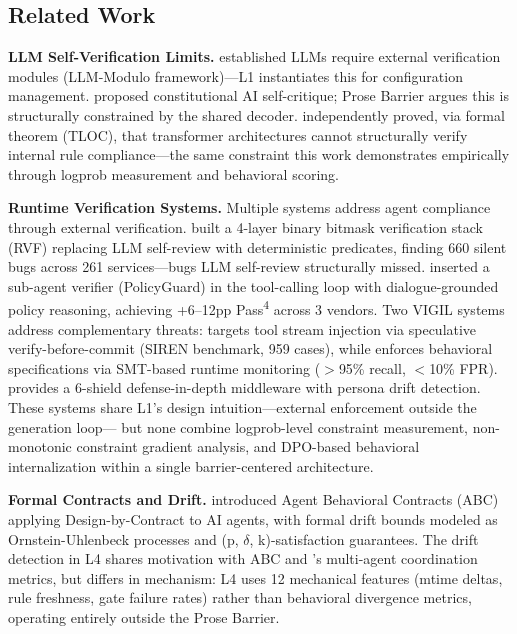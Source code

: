 \documentclass[11pt]{article}
\begin{document}
\subsection{Related Work}

\textbf{LLM Self-Verification Limits.} \citet{kambhampati2024} established LLMs
require external verification modules (LLM-Modulo framework)---L1 instantiates
this for configuration management. \citet{bai2022constitutional} proposed
constitutional AI self-critique; Prose Barrier argues this is structurally
constrained by the shared decoder. \citet{startari2025tloc} independently
proved, via formal theorem (TLOC), that transformer architectures cannot
structurally verify internal rule compliance---the same constraint this work
demonstrates empirically through logprob measurement and behavioral scoring.

\textbf{Runtime Verification Systems.} Multiple systems address agent compliance
through external verification. \citet{sharma2026rvf} built a 4-layer binary
bitmask verification stack (RVF) replacing LLM self-review with deterministic
predicates, finding 660 silent bugs across 261 services---bugs LLM self-review
structurally missed. \citet{kang2026policyguard} inserted a sub-agent verifier
(PolicyGuard) in the tool-calling loop with dialogue-grounded policy reasoning,
achieving +6--12pp Pass\textsuperscript{4} across 3 vendors. Two VIGIL systems
address complementary threats: \citet{lin2026vigil} targets tool stream injection
via speculative verify-before-commit (SIREN benchmark, 959 cases), while
\citet{li2026vigil} enforces behavioral specifications via SMT-based runtime
monitoring ($>$95\% recall, $<$10\% FPR). \citet{zhang2026sentinelshield} provides a
6-shield defense-in-depth middleware with persona drift detection. These systems
share L1's design intuition---external enforcement outside the generation loop---
but none combine logprob-level constraint measurement, non-monotonic constraint
gradient analysis, and DPO-based behavioral internalization within a single
barrier-centered architecture.

\textbf{Formal Contracts and Drift.} \citet{bhardwaj2026abc} introduced Agent
Behavioral Contracts (ABC) applying Design-by-Contract to AI agents, with formal
drift bounds modeled as Ornstein-Uhlenbeck processes and (p, $\delta$,
k)-satisfaction guarantees. The drift detection in L4 shares motivation with ABC
and \citet{rath2026agent}'s multi-agent coordination metrics, but differs in
mechanism: L4 uses 12 mechanical features (mtime deltas, rule freshness, gate
failure rates) rather than behavioral divergence metrics, operating entirely
outside the Prose Barrier.
\end{document}
